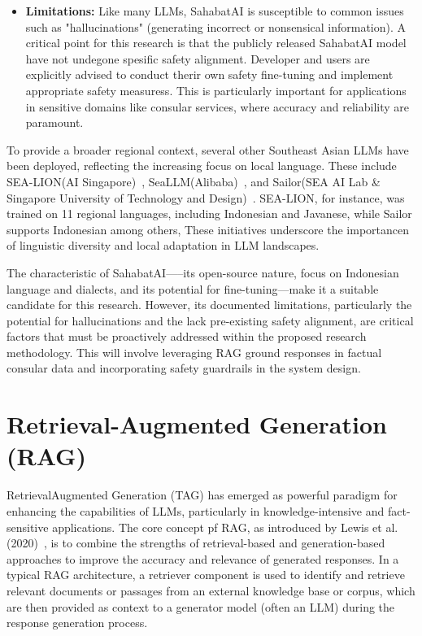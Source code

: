 \documentclass[12pt]{report}
\begin{document}
\begin{itemize}
  \item \textbf{Limitations:} Like many LLMs, SahabatAI is susceptible to common issues such as "hallucinations" (generating incorrect or nonsensical information). A critical point for this research is that the publicly released SahabatAI model have not undegone spesific safety alignment. Developer and users are explicitly advised to conduct therir own safety fine-tuning and implement appropriate safety measuress. This is particularly important for applications in sensitive domains like consular services, where accuracy and reliability are paramount. 
\end{itemize}

To provide a broader regional context, several other Southeast Asian LLMs have been deployed, reflecting the increasing focus on local language. These include SEA-LION(AI Singapore)~\cite{ng2025sealionsoutheastasianlanguages}, SeaLLM(Alibaba)~\cite{zhang2024seallms3openfoundation}, and Sailor(SEA AI Lab \& Singapore University of Technology and Design)~\cite{dou2024sailoropenlanguagemodels}. SEA-LION, for instance, was trained on 11 regional languages, including Indonesian and Javanese, while Sailor supports Indonesian among others, These initiatives underscore the importancen of linguistic diversity and local adaptation in LLM landscapes.

The characteristic of SahabatAI—--its open-source nature, focus on Indonesian language and dialects, and its potential for fine-tuning---make it a suitable candidate for this research. However, its documented limitations, particularly the potential for hallucinations and the lack pre-existing safety alignment, are critical factors that must be proactively addressed within the proposed research methodology. This will involve leveraging RAG ground responses in factual consular data and incorporating safety guardrails in the system design.


\section{Retrieval-Augmented Generation (RAG)}

RetrievalAugmented Generation (TAG) has emerged as powerful paradigm for enhancing the capabilities of LLMs, particularly in knowledge-intensive and fact-sensitive applications. The core concept pf RAG, as introduced by Lewis et al. (2020)~\cite{NEURIPS2020_6b493230}, is to combine the strengths of retrieval-based and generation-based approaches to improve the accuracy and relevance of generated responses. In a typical RAG architecture, a retriever component is used to identify and retrieve relevant documents or passages from an external knowledge base or corpus, which are then provided as context to a generator model (often an LLM) during the response generation process.
\end{document}
